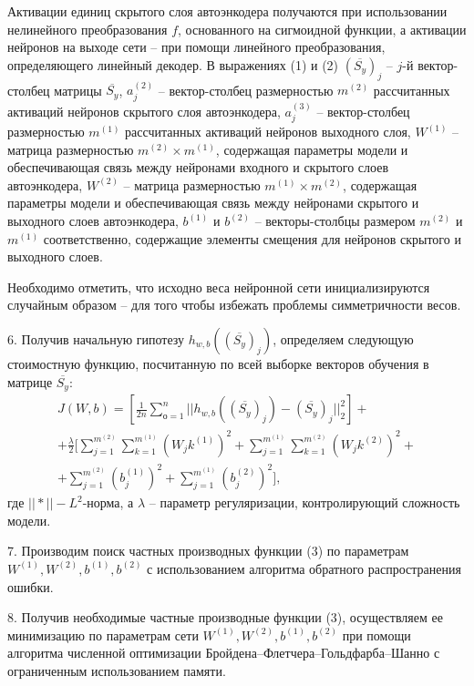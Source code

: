 \documentclass[a4paper,12pt]{article}
\begin{document}
Активации единиц скрытого слоя автоэнкодера получаются при использовании нелинейного преобразования $f$, основанного на сигмоидной функции, а активации нейронов на выходе сети – при помощи линейного преобразования, определяющего линейный декодер. В выражениях (1) и (2) $(\overline{S_y})_j$ – $j$-й вектор-столбец матрицы $\overline{S_y}$, $a_j^{(2)}$ – вектор-столбец размерностью $m^{(2)}$ рассчитанных активаций нейронов скрытого слоя автоэнкодера, $a_j^{(3)}$ – вектор-столбец размерностью $m^{(1)}$ рассчитанных активаций нейронов выходного слоя, $W^{(1)}$ – матрица размерностью $m^{(2)} \times m^{(1)}$, содержащая параметры модели и обеспечивающая связь между нейронами входного и скрытого слоев автоэнкодера, $W^{(2)}$ – матрица размерностью $m^{(1)} \times m^{(2)}$, содержащая параметры модели
и обеспечивающая связь между нейронами скрытого и
выходного слоев автоэнкодера, $b^{(1)}$ и $b^{(2)}$ – векторы-столбцы размером $m^{(2)}$ и $m^{(1)}$ соответственно, содержащие элементы смещения для нейронов скрытого и выходного слоев.

Необходимо отметить, что исходно веса нейронной сети инициализируются случайным образом – для того чтобы избежать проблемы симметричности весов.

6. Получив начальную гипотезу $h_{w,b}((\overline{S_y})_j)$, определяем следующую стоимостную функцию, посчитанную по всей выборке векторов обучения в матрице $\overline{S_y}:$
\begin{eqnarray}
J(W,b) = [\frac{1}{2n}\sum_{о=1}^n|| h_{w,b}((\overline{S_y})_j) - (\overline{S_y})_j ||_2^2] + \nonumber \\+ \frac{\lambda}{2}[\sum_{j=1}^{m^{(2)}}\sum_{k=1}^{m^{(1)}}(W_jk^{(1)})^2 + \sum_{j=1}^{m^{(1)}}\sum_{k=1}^{m^{(2)}}(W_jk^{(2)})^2 + \nonumber \\+ \sum_{j=1}^{m^{(2)}}(b_j^{(1)})^2 + \sum_{j=1}^{m^{(1)}}(b_j^{(2)})^2],
\end{eqnarray}
где $||*|| - L^2$-норма, а $\lambda$ – параметр регуляризации, контролирующий сложность модели.

7. Производим поиск частных производных функции (3) по параметрам $W^{(1)}, W^{(2)}, b^{(1)}, b^{(2)}$ с использованием алгоритма обратного распространения ошибки.

8. Получив необходимые частные производные функции (3), осуществляем ее минимизацию по параметрам сети $W^{(1)}, W^{(2)}, b^{(1)}, b^{(2)}$ при помощи алгоритма численной оптимизации Бройдена–Флетчера–Гольдфарба–Шанно с ограниченным использованием памяти.
\end{document}
